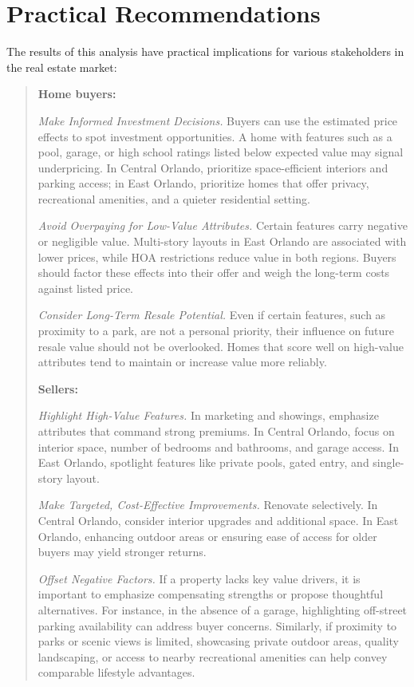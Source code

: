 \section*{Practical Recommendations}

The results of this analysis have practical implications for various stakeholders in the real estate market:

\begin{quote} 

\noindent \textbf{Home buyers:}

\noindent \textit{Make Informed Investment Decisions.} Buyers can use the estimated price effects to spot investment opportunities. A home with features such as a pool, garage, or high school ratings listed below expected value may signal underpricing. In Central Orlando, prioritize space-efficient interiors and parking access; in East Orlando, prioritize homes that offer privacy, recreational amenities, and a quieter residential setting.

\noindent \textit{Avoid Overpaying for Low-Value Attributes.}
\noindent Certain features carry negative or negligible value. Multi-story layouts in East Orlando are associated with lower prices, while HOA restrictions reduce value in both regions. Buyers should factor these effects into their offer and weigh the long-term costs against listed price.

\noindent \textit{Consider Long-Term Resale Potential.}
\noindent Even if certain features, such as proximity to a park, are not a personal priority, their influence on future resale value should not be overlooked.  Homes that score well on high-value attributes tend to maintain or increase value more reliably. 


\noindent \textbf{Sellers:}

\noindent \textit{Highlight High-Value Features.}
In marketing and showings, emphasize attributes that command strong premiums. In Central Orlando, focus on interior space, number of bedrooms and bathrooms, and garage access. In East Orlando, spotlight features like private pools, gated entry, and single-story layout.

\noindent \textit{Make Targeted, Cost-Effective Improvements.}
Renovate selectively. In Central Orlando, consider interior upgrades and additional space. In East Orlando, enhancing outdoor areas or ensuring ease of access for older buyers may yield stronger returns. 

\noindent \textit{Offset Negative Factors.}
If a property lacks key value drivers, it is important to emphasize compensating strengths or propose thoughtful alternatives. For instance, in the absence of a garage, highlighting off-street parking availability can address buyer concerns. Similarly, if proximity to parks or scenic views is limited, showcasing private outdoor areas, quality landscaping, or access to nearby recreational amenities can help convey comparable lifestyle advantages.


\end{quote}
